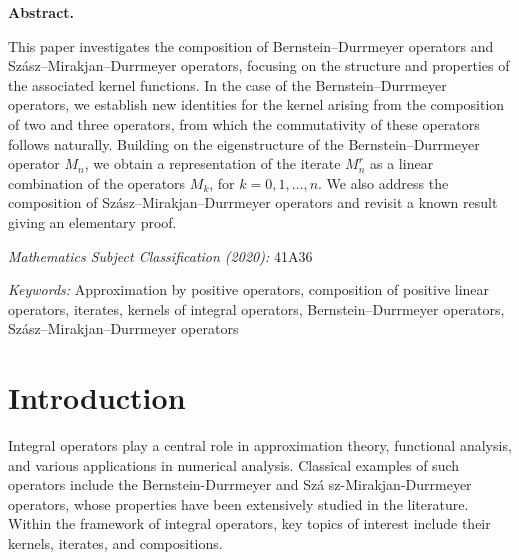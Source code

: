 \documentclass[12pt,reqno]{article}
\begin{document}
\vspace{2cm}

{\large \textbf{Abstract.}}

\bigskip

This paper investigates the composition of Bernstein--Durrmeyer operators and Szász--Mirakjan--Durrmeyer operators, focusing on the structure and properties of the associated kernel functions. In the case of the Bernstein--Durrmeyer operators, we establish new identities for the kernel arising from the composition of two and three operators, from which the commutativity of these operators follows naturally. Building on the eigenstructure of the Bernstein–Durrmeyer operator $M_n$, we obtain a representation of the iterate $M_n^r$ as a linear combination of the operators $M_k$, for $k=0,1,\dots,n$. We also address the composition of Szász--Mirakjan--Durrmeyer operators and revisit a known result giving an elementary  proof. 

\bigskip

\smallskip \emph{Mathematics Subject Classification (2020):} 41A36 %

\smallskip \emph{Keywords:} Approximation by positive operators, 
composition of positive linear operators, iterates, kernels of integral operators, Bernstein--Durrmeyer operators, Szász--Mirakjan--Durrmeyer operators
\vspace{2cm}


\section{Introduction}

\label{intro}

Integral operators play a central role in approximation theory, functional
analysis, and various applications in numerical analysis. Classical examples
of such operators include the Bernstein-Durrmeyer and Sz\'{a}%
sz-Mirakjan-Durrmeyer operators, whose properties have been extensively
studied in the literature.
Within the framework of
integral operators, key topics of interest include their kernels, iterates,
and compositions.
\end{document}
